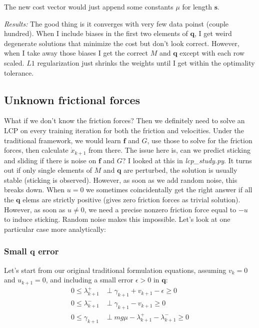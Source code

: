 \documentclass{article}
\renewcommand{\vec}[1]{\boldsymbol{#1}}
\begin{document}
The new cost vector would just append some constants $\mu$ for length $\vec{s}$.

\textit{Results: } The good thing is it converges with very few data poinst (couple hundred). When I include biases in the first two elements of $\vec{q}$, I get weird degenerate solutions that minimize the cost but don't look correct. However, when I take away those biases I get the correct $M$ and $\vec{q}$ except with each row scaled. $L1$ regularization just shrinks the weights until I get within the optimality tolerance.

\subsection{Unknown frictional forces}
What if we don't know the friction forces? Then we definitely need to solve an LCP on every training iteration for both the friction and velocities. Under the traditional framework, we would learn $\vec{f}$ and $G$, use those to solve for the friction forces, then calculate $\dot x_{k+1}$ from there. The issue here is, can we predict sticking and sliding if there is noise on $\vec{f}$ and $G$? I looked at this in \textit{lcp\_study.py}. It turns out if only single elements of $M$ and $\vec{q}$ are perturbed, the solution is usually stable (sticking is observed). However, as soon as we add random noise, this breaks down. When $u=0$ we sometimes coincidentally get the right answer if all the $\vec{q}$ elems are strictly positive (gives zero friction forces as trivial solution). However, as soon as $u \neq 0$, we need a precise nonzero friction force equal to $-u$ to induce sticking. Random noise makes this impossible. Let's look at one particular case more analytically:

\subsubsection{Small $\vec{q}$ error}
Let's start from our original traditional formulation equations, assuming $v_k = 0$ and $u_{k+1} = 0$, and including a small error $\epsilon > 0$ in $\vec{q}$:
\begin{align*}
    0 \leq \lambda^+_{k+1} &\perp \gamma_{k+1} + v_{k+1} - \epsilon \geq 0\\
    0 \leq \lambda^-_{k+1} &\perp \gamma_{k+1} - v_{k+1} \geq 0\\
    0 \leq \gamma_{k+1} &\perp m g \mu - \lambda^+_{k+1} - \lambda^-_{k+1} \geq 0
\end{align*}
\end{document}
